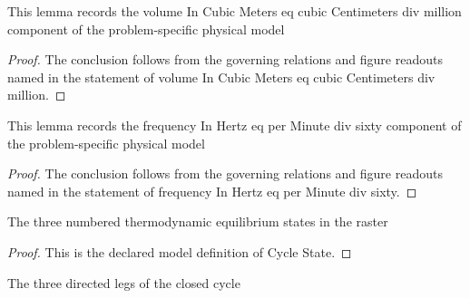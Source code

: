 \begin{lemma}
  \label{lem:physics:phyx-mini-0426:phyxminiproblems-problemphyxmini0426-volumeincubicmeters-eq-cubiccentimeters-div-million}
  This lemma records the volume In Cubic Meters eq cubic Centimeters div million component of the problem-specific physical model
\end{lemma}
\begin{proof}
  The conclusion follows from the governing relations and figure readouts named in the statement of volume In Cubic Meters eq cubic Centimeters div million.
\end{proof}
\begin{lemma}
  \label{lem:physics:phyx-mini-0426:phyxminiproblems-problemphyxmini0426-frequencyinhertz-eq-perminute-div-sixty}
  This lemma records the frequency In Hertz eq per Minute div sixty component of the problem-specific physical model
\end{lemma}
\begin{proof}
  The conclusion follows from the governing relations and figure readouts named in the statement of frequency In Hertz eq per Minute div sixty.
\end{proof}
\begin{definition}
  \label{def:physics:phyx-mini-0426:phyxminiproblems-problemphyxmini0426-cyclestate}
  The three numbered thermodynamic equilibrium states in the raster
\end{definition}
\begin{proof}
  This is the declared model definition of Cycle State.
\end{proof}
\begin{definition}
  \label{def:physics:phyx-mini-0426:phyxminiproblems-problemphyxmini0426-cycleleg}
  The three directed legs of the closed cycle
\end{definition}

